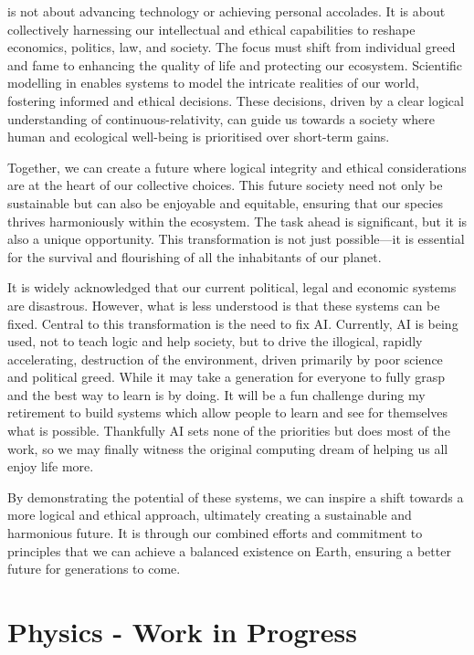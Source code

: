 \documentclass[12pt]{article}
\begin{document}
\iR{} is not about advancing technology or achieving personal accolades. It is about collectively harnessing our intellectual and ethical capabilities to reshape economics, politics, law, and society. The focus must shift from individual greed and fame to enhancing the quality of life and protecting our ecosystem. Scientific modelling in \iR{} enables systems to model the intricate realities of our world, fostering informed and ethical decisions. These decisions, driven by a clear logical understanding of continuous-relativity, can guide us towards a society where human and ecological well-being is prioritised over short-term gains.

Together, we can create a future where logical integrity and ethical considerations are at the heart of our collective choices. This future society need not only be sustainable but can also be enjoyable and equitable, ensuring that our species thrives harmoniously within the ecosystem. The task ahead is significant, but it is also a unique opportunity. This transformation is not just possible—it is essential for the survival and flourishing of all the inhabitants of our planet.

It is widely acknowledged that our current political, legal and economic systems are disastrous. However, what is less understood is that these systems can be fixed. Central to this transformation is the need to fix AI. Currently, AI is being used, not to teach logic and help society, but to drive the illogical, rapidly accelerating, destruction of the environment, driven primarily by poor science and political greed. While it may take a generation for everyone to fully grasp \iR{} and \qbit{} the best way to learn is by doing. It will be a fun challenge during my retirement to build systems which allow people to learn and see for themselves what is possible. Thankfully \iR{} AI sets none of the priorities but does most of the work, so we may finally witness the original computing dream of helping us all enjoy life more.

By demonstrating the potential of these systems, we can inspire a shift towards a more logical and ethical approach, ultimately creating a sustainable and harmonious future. It is through our combined efforts and commitment to \iR{} principles that we can achieve a balanced existence on Earth, ensuring a better future for generations to come.

\section*{Physics - \iR{} Work in Progress}
\end{document}
